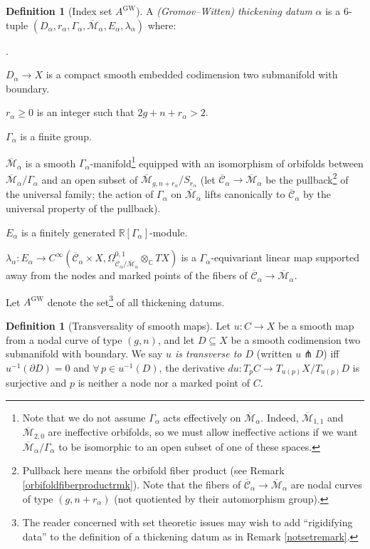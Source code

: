 \documentclass[12pt]{article}
\theoremstyle{definition}
\newtheorem{definition}[theorem]{Definition}
\theoremstyle{remark}
\numberwithin{equation}{subsection}
\newcommand{\CC}{\mathbb C}
\newcommand{\RR}{\mathbb R}
\newcommand{\Mbar}{\overline{\mathcal M}}
\newcommand{\Cbar}{\overline{\mathcal C}}
\newcommand{\GW}{\mathrm{GW}}
\newcounter{rcounti}
\newenvironment{rlist}{\begin{list}{\roman{rcounti}.}{\usecounter{rcounti}
\setlength\itemsep{0pt}
\setlength\labelsep{4pt}
\setlength\labelwidth{16pt}
\setlength\leftmargin{32pt}
\setlength\listparindent{0pt}
\setlength\parsep{0pt}
\setlength\parskip{0pt}
\setlength\partopsep{0pt}
\setlength\rightmargin{0pt}
\setlength\topsep{0pt}
\setlength\itemindent{0pt}
}}{\end{list}}
\begin{document}
\begin{definition}[Index set $A^\GW$]\label{divisorthicken}
A \emph{(Gromov--Witten) thickening datum} $\alpha$ is a 6-tuple $(D_\alpha,r_\alpha,\Gamma_\alpha,\Mbar_\alpha,E_\alpha,\lambda_\alpha)$ where:
\begin{rlist}
\item$D_\alpha\to X$ is a compact smooth embedded codimension two submanifold with boundary.
\item$r_\alpha\geq 0$ is an integer such that $2g+n+r_\alpha>2$.
\item$\Gamma_\alpha$ is a finite group.
\item$\Mbar_\alpha$ is a smooth $\Gamma_\alpha$-manifold\footnote{Note that we do not assume $\Gamma_\alpha$ acts effectively on $\Mbar_\alpha$.  Indeed, $\Mbar_{1,1}$ and $\Mbar_{2,0}$ are ineffective orbifolds, so we must allow ineffective actions if we want $\Mbar_\alpha/\Gamma_\alpha$ to be isomorphic to an open subset of one of these spaces.} equipped with an isomorphism of orbifolds between $\Mbar_\alpha/\Gamma_\alpha$ and an open subset of $\Mbar_{g,n+r_\alpha}/S_{r_\alpha}$ (let $\Cbar_\alpha\to\Mbar_\alpha$ be the pullback\footnote{Pullback here means the orbifold fiber product (see Remark \ref{orbifoldfiberproductrmk}).  Note that the fibers of $\Cbar_\alpha\to\Mbar_\alpha$ are nodal curves of type $(g,n+r_\alpha)$ (not quotiented by their automorphism group).} of the universal family; the action of $\Gamma_\alpha$ on $\Mbar_\alpha$ lifts canonically to $\Cbar_\alpha$ by the universal property of the pullback).
\item$E_\alpha$ is a finitely generated $\RR[\Gamma_\alpha]$-module.
\item$\lambda_\alpha:E_\alpha\to C^\infty(\Cbar_\alpha\times X,\Omega^{0,1}_{\Cbar_\alpha/\Mbar_\alpha}\otimes_\CC TX)$ is a $\Gamma_\alpha$-equivariant linear map supported away from the nodes and marked points of the fibers of $\Cbar_\alpha\to\Mbar_\alpha$.
\end{rlist}
Let $A^{\GW}$ denote the set\footnote{The reader concerned with set theoretic issues may wish to add ``rigidifying data'' to the definition of a thickening datum as in Remark \ref{notsetremark}.} of all thickening datums.
\end{definition}

\begin{definition}[Transversality of smooth maps]
Let $u:C\to X$ be a smooth map from a nodal curve of type $(g,n)$, and let $D\subseteq X$ be a smooth codimension two submanifold with boundary.  We say \emph{$u$ is transverse to $D$} (written $u\pitchfork D$) iff $u^{-1}(\partial D)=0$ and $\forall\,p\in u^{-1}(D)$, the derivative $du:T_pC\to T_{u(p)}X/T_{u(p)}D$ is surjective and $p$ is neither a node nor a marked point of $C$.
\end{definition}
\end{document}
